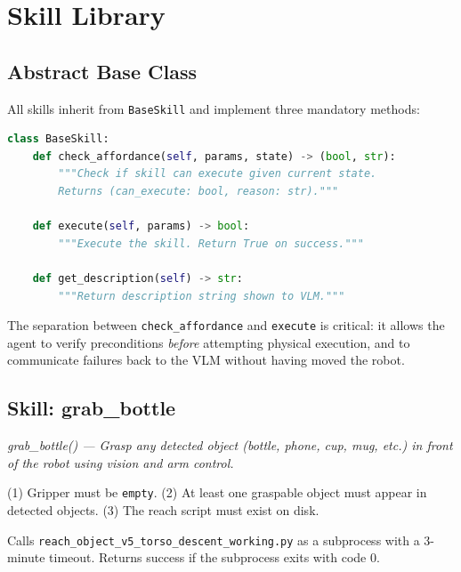 \section{Skill Library}

\subsection{Abstract Base Class}

All skills inherit from \texttt{BaseSkill} and implement three mandatory methods:

\begin{lstlisting}[language=Python, caption={BaseSkill abstract interface.}]
class BaseSkill:
    def check_affordance(self, params, state) -> (bool, str):
        """Check if skill can execute given current state.
        Returns (can_execute: bool, reason: str)."""

    def execute(self, params) -> bool:
        """Execute the skill. Return True on success."""

    def get_description(self) -> str:
        """Return description string shown to VLM."""
\end{lstlisting}

The separation between \texttt{check\_affordance} and \texttt{execute} is critical:
it allows the agent to verify preconditions \emph{before} attempting physical
execution, and to communicate failures back to the VLM without having moved the robot.

\subsection{Skill: grab\_bottle}

\begin{description}[noitemsep]
  \item[Description shown to VLM:] \textit{grab\_bottle() — Grasp any detected
    object (bottle, phone, cup, mug, etc.) in front of the robot using vision and
    arm control.}
  \item[Affordance check:]
    (1) Gripper must be \texttt{empty}.
    (2) At least one graspable object must appear in detected objects.
    (3) The reach script must exist on disk.
  \item[Execution:] Calls \texttt{reach\_object\_v5\_torso\_descent\_working.py}
    as a subprocess with a 3-minute timeout.
    Returns success if the subprocess exits with code 0.
\end{description}

